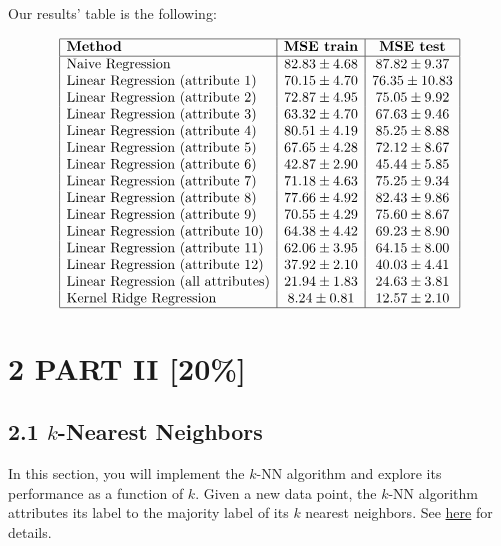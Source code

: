 \documentclass{article}
\begin{document}
Our results' table is the following:

\[
\begin{array}{|l|c|c|}
\hline
\textbf{Method} & \textbf{MSE train} & \textbf{MSE test} \\
\hline
\text{Naive Regression} & 82.83 \pm 4.68 & 87.82 \pm 9.37 \\
\text{Linear Regression (attribute 1)} & 70.15 \pm 4.70 & 76.35 \pm 10.83 \\
\text{Linear Regression (attribute 2)} & 72.87 \pm 4.95 & 75.05 \pm 9.92 \\
\text{Linear Regression (attribute 3)} & 63.32 \pm 4.70 & 67.63 \pm 9.46 \\
\text{Linear Regression (attribute 4)} & 80.51 \pm 4.19 & 85.25 \pm 8.88 \\
\text{Linear Regression (attribute 5)} & 67.65 \pm 4.28 & 72.12 \pm 8.67 \\
\text{Linear Regression (attribute 6)} & 42.87 \pm 2.90 & 45.44 \pm 5.85 \\
\text{Linear Regression (attribute 7)} & 71.18 \pm 4.63 & 75.25 \pm 9.34 \\
\text{Linear Regression (attribute 8)} & 77.66 \pm 4.92 & 82.43 \pm 9.86 \\
\text{Linear Regression (attribute 9)} & 70.55 \pm 4.29 & 75.60 \pm 8.67 \\
\text{Linear Regression (attribute 10)} & 64.38 \pm 4.42 & 69.23 \pm 8.90 \\
\text{Linear Regression (attribute 11)} & 62.06 \pm 3.95 & 64.15 \pm 8.00 \\
\text{Linear Regression (attribute 12)} & 37.92 \pm 2.10 & 40.03 \pm 4.41 \\
\text{Linear Regression (all attributes)} & 21.94 \pm 1.83 & 24.63 \pm 3.81 \\
\text{Kernel Ridge Regression} & 8.24 \pm 0.81 & 12.57 \pm 2.10 \\
\hline
\end{array}
\]

\section*{2 PART II [20\%]}

\subsection*{2.1 $k$-Nearest Neighbors}

In this section, you will implement the $k$-NN algorithm and explore its performance as a function of $k$. Given a new data point, the $k$-NN algorithm attributes its label to the majority label of its $k$ nearest neighbors. See \href{https://example.com}{here} for details.
\end{document}
